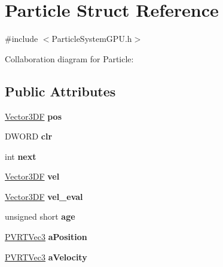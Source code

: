 \hypertarget{struct_particle}{\section{Particle Struct Reference}
\label{struct_particle}
}


{\ttfamily \#include $<$Particle\+System\+G\+P\+U.\+h$>$}



Collaboration diagram for Particle\+:
\subsection*{Public Attributes}
\begin{DoxyCompactItemize}
\item 
\hypertarget{struct_particle_aa5e349fa61ed8cc17c5ea161bae7c969}{\hyperlink{class_vector3_d_f}{Vector3\+D\+F} {\bfseries pos}}\label{struct_particle_aa5e349fa61ed8cc17c5ea161bae7c969}

\item 
\hypertarget{struct_particle_adcf7045e38914ffd689586c75fd14486}{D\+W\+O\+R\+D {\bfseries clr}}\label{struct_particle_adcf7045e38914ffd689586c75fd14486}

\item 
\hypertarget{struct_particle_afbb91cffd44c3f58b5f9ed8f1ee9fee2}{int {\bfseries next}}\label{struct_particle_afbb91cffd44c3f58b5f9ed8f1ee9fee2}

\item 
\hypertarget{struct_particle_a85a62d9703a350f43d3e2eb31d7ada48}{\hyperlink{class_vector3_d_f}{Vector3\+D\+F} {\bfseries vel}}\label{struct_particle_a85a62d9703a350f43d3e2eb31d7ada48}

\item 
\hypertarget{struct_particle_abdcd1afc6b47d6118af51aa3b680d31b}{\hyperlink{class_vector3_d_f}{Vector3\+D\+F} {\bfseries vel\+\_\+eval}}\label{struct_particle_abdcd1afc6b47d6118af51aa3b680d31b}

\item 
\hypertarget{struct_particle_ae267428f96e521597618397546496ab2}{unsigned short {\bfseries age}}\label{struct_particle_ae267428f96e521597618397546496ab2}

\item 
\hypertarget{struct_particle_ade748b738261810ea99b3da33888407c}{\hyperlink{struct_p_v_r_t_vec3}{P\+V\+R\+T\+Vec3} {\bfseries a\+Position}}\label{struct_particle_ade748b738261810ea99b3da33888407c}

\item 
\hypertarget{struct_particle_a7b4840c211d76ac0fc78157d2c164516}{\hyperlink{struct_p_v_r_t_vec3}{P\+V\+R\+T\+Vec3} {\bfseries a\+Velocity}}\label{struct_particle_a7b4840c211d76ac0fc78157d2c164516}


\end{DoxyCompactItemize}
